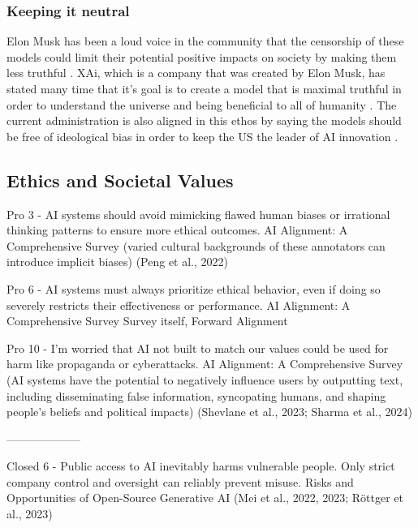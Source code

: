 \subsubsection{Keeping it neutral}

Elon Musk has been a loud voice in the community that the censorship of these models could limit their potential positive impacts on society by making them less truthful \citep{perrigo_elon_2023}. XAi, which is a company that was created by Elon Musk, has stated many time that it's goal is to create a model that is maximal truthful in order to understand the universe and being beneficial to all of humanity \citep{xai_series_2024}. The current administration is also aligned in this ethos by saying the models should be free of ideological bias in order to keep the US the leader of AI innovation \citep{whitehouse_removing_2025}.


\subsection{Ethics and Societal Values}

Pro 3 - AI systems should avoid mimicking flawed human biases or irrational thinking patterns to ensure more ethical outcomes.
AI Alignment: A Comprehensive Survey
(varied cultural backgrounds of these annotators can introduce implicit biases)
(Peng et al., 2022)
\citep{peng_investigations_2022}
\citep{openai_gpt_4_2023}

Pro 6 - AI systems must always prioritize ethical behavior, even if doing so severely restricts their effectiveness or performance.
AI Alignment: A Comprehensive Survey
Survey itself, Forward Alignment
\citep{ji_ai_2023}

Pro 10 - I’m worried that AI not built to match our values could be used for harm like propaganda or cyberattacks.
AI Alignment: A Comprehensive Survey
(AI systems have the potential to negatively influence users by outputting text, including disseminating false information, syncopating humans, and shaping people’s beliefs and political impacts)
(Shevlane et al., 2023; Sharma et al., 2024)
\citep{sharma_towards_2023}
\citep{shevlane_model_2023}

--------------------

Closed 6 - Public access to AI inevitably harms vulnerable people. Only strict company control and oversight can reliably prevent misuse.
Risks and Opportunities of Open-Source Generative AI
(Mei et al., 2022, 2023; Röttger et al., 2023)
\citep{mei_mitigating_2022}
\citep{mei_assert_2023}
\citep{rottger_xstest_2024}

